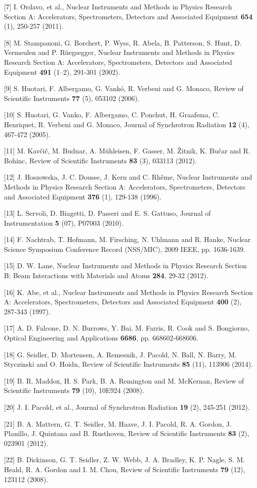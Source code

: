{[}7{]} I. Ordavo, et al., Nuclear Instruments
and Methods in Physics Research Section A: Accelerators, Spectrometers,
Detectors and Associated Equipment \textbf{654} (1), 250-257 (2011).

{[}8{]} M. Stampanoni, G. Borchert, P. Wyss,
R. Abela, B. Patterson, S. Hunt, D. Vermeulen and P. Rüegsegger, Nuclear
Instruments and Methods in Physics Research Section A: Accelerators,
Spectrometers, Detectors and Associated Equipment \textbf{491} (1--2),
291-301 (2002).

{[}9{]} S. Huotari, F. Albergamo, G. Vankó, R.
Verbeni and G. Monaco, Review of Scientific Instruments \textbf{77} (5),
053102 (2006).

{[}10{]} S. Huotari, G. Vanko, F. Albergamo,
C. Ponchut, H. Graafsma, C. Henriquet, R. Verbeni and G. Monaco, Journal
of Synchrotron Radiation \textbf{12} (4), 467-472 (2005).

{[}11{]} M. Kavčič, M. Budnar, A. Mühleisen,
F. Gasser, M. Žitnik, K. Bučar and R. Bohinc, Review of Scientific
Instruments \textbf{83} (3), 033113 (2012).

{[}12{]} J. Hoszowska, J. C. Dousse, J. Kern
and C. Rhême, Nuclear Instruments and Methods in Physics Research
Section A: Accelerators, Spectrometers, Detectors and Associated
Equipment \textbf{376} (1), 129-138 (1996).

{[}13{]} L. Servoli, D. Biagetti, D. Passeri
and E. S. Gattuso, Journal of Instrumentation \textbf{5} (07), P07003
(2010).

{[}14{]} F. Nachtrab, T. Hofmann, M.
Firsching, N. Uhlmann and R. Hanke, Nuclear Science Symposium Conference
Record (NSS/MIC), 2009 IEEE, pp. 1636-1639.

{[}15{]} D. W. Lane, Nuclear Instruments and
Methods in Physics Research Section B: Beam Interactions with Materials
and Atoms \textbf{284}, 29-32 (2012).

{[}16{]} K. Abe, et al., Nuclear Instruments
and Methods in Physics Research Section A: Accelerators, Spectrometers,
Detectors and Associated Equipment \textbf{400} (2), 287-343 (1997).

{[}17{]} A. D. Falcone, D. N. Burrows, Y.
Bai, M. Farris, R. Cook and S. Bongiorno, Optical Engineering and
Applications \textbf{6686}, pp. 668602-668606.

{[}18{]} G. Seidler, D. Mortensen, A.
Remesnik, J. Pacold, N. Ball, N. Barry, M. Styczinski and O. Hoidn,
Review of Scientific Instruments \textbf{85} (11), 113906 (2014).

{[}19{]} B. R. Maddox, H. S. Park, B. A.
Remington and M. McKernan, Review of Scientific Instruments \textbf{79}
(10), 10E924 (2008).

{[}20{]} J. I. Pacold, et al., Journal of
Synchrotron Radiation \textbf{19} (2), 245-251 (2012).

{[}21{]} B. A. Mattern, G. T. Seidler, M.
Haave, J. I. Pacold, R. A. Gordon, J. Planillo, J. Quintana and B.
Rusthoven, Review of Scientific Instruments \textbf{83} (2), 023901
(2012).

{[}22{]} B. Dickinson, G. T. Seidler, Z. W.
Webb, J. A. Bradley, K. P. Nagle, S. M. Heald, R. A. Gordon and I. M.
Chou, Review of Scientific Instruments \textbf{79} (12), 123112 (2008).
